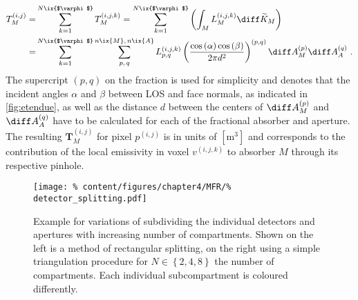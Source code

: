 %
        \begin{align}%
            \begin{split}%
                T^{\left(i,j\right)}_{M}=&\sum_{k=1}^{N\ix{$\varphi$}}T^{\left(i,j,k\right)}_{M}=\sum_{k=1}^{N\ix{$\varphi$}}\left(\int_{M}L^{\left(i,j,k\right)}_{M}\diff\widetilde{K}_{M}\right)\\%
                =&\sum_{k=1}^{N\ix{$\varphi$}}\sum_{p,\,q}^{n\ix{M},\,n\ix{A}}L^{\left(i,j,k\right)}_{p,q}\left(\frac{\cos\left(\alpha\right)\cos\left(\beta\right)}{2\pi d^{2}}\right)^{\left(p,q\right)}\diff A_{M}^{\left(p\right)}\diff A_{A}^{\left(q\right)}\,\,.%
            \end{split}\label{eq:discrete_emissivity}%
        \end{align}%
%
        The supercript $\left(p,q\right)$ on the fraction is used for simplicity and denotes that the incident angles $\alpha$ and $\beta$ between LOS and face normals, as indicated in \cref{fig:etendue}, as well as the distance $d$ between the centers of $\diff A_{M}^{\left(p\right)}$ and $\diff A_{A}^{\left(q\right)}$ have to be calculated for each of the fractional absorber and aperture. The resulting  $\mathbf{T}_{M}^{\left(i,j\right)}$ for pixel $p^{\left(i,j\right)}$ is in units of $\left[\text{m}^{3}\right]$ and corresponds to the contribution of the local emissivity in voxel $v^{\left(i,j,k\right)}$ to absorber $M$ through its respective pinhole.%
%
        \begin{figure}[t]%
            \centering%
            \texttt{[image: \%
                content/figures/chapter4/MFR/\%
                detector\_splitting.pdf]}%
            \caption{Example for variations of subdividing the individual detectors and apertures with increasing number of compartments. Shown on the left is a method of rectangular splitting, on the right using a simple triangulation procedure for $N\in\left\{2,4,8\right\}$ the number of compartments. Each individual subcompartment is coloured differently.}\label{fig:detector_splitting}%
        \end{figure}%
%
